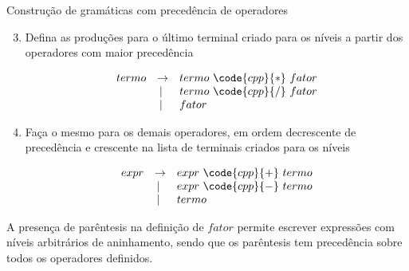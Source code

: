 \begin{frame}[fragile]{Construção de gramáticas com precedência de operadores}

    \begin{enumerate}
        \setcounter{enumi}{2}
        \item Defina as produções para o último terminal criado para os níveis a partir dos operadores com maior precedência
        \pause
        \begin{footnotesize}
        \[
            \begin{array}{rcl}
                termo & \to & termo\ \code{cpp}{*}\ fator \\
                & |\ & termo\ \code{cpp}{/}\ fator \\
                & |\ & fator
            \end{array}
        \]
        \end{footnotesize}
        \pause
       
        \item Faça o mesmo para os demais operadores, em ordem decrescente de precedência e crescente na lista de terminais criados para os níveis
        \pause
        \begin{footnotesize}
        \[
            \begin{array}{rcl}
                expr & \to & expr\ \code{cpp}{+}\ termo \\
                & |\ & expr\ \code{cpp}{-}\ termo \\
                & |\ & termo
            \end{array}
        \]
        \end{footnotesize}
        \pause
    \end{enumerate}

    \vspace{0.1in}

    A presença de parêntesis na definição de $fator$ permite escrever expressões com níveis arbitrários de aninhamento, sendo que os parêntesis tem precedência
    sobre todos os operadores definidos.
    
\end{frame}

